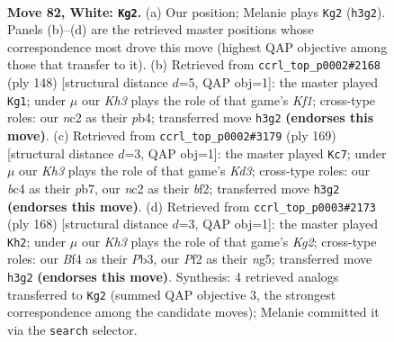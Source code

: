 \documentclass[11pt]{article}
\begin{document}
\clearpage

\begin{figure}[p]\centering
\begin{subfigure}{0.46\textwidth}\centering
\resizebox{\linewidth}{!}{%
\newchessgame
\chessboard[
  setfen={8/7k/8/8/2b2B2/7K/2n2P2/8 w - - 9 82},
  showmover=false,
  pgfstyle=straightmove, color=movearrow, markmove={h3-g2}
]}
\caption{}
\end{subfigure}\hfill
\begin{subfigure}{0.46\textwidth}\centering
\resizebox{\linewidth}{!}{%
\newchessgame
\chessboard[
  setfen={8/3B4/8/8/1p5k/1P6/8/2b2K2 w - - 12 75},
  showmover=false,
  pgfstyle=straightmove, color=movearrow, markmove={f1-g1}
]}
\caption{}
\end{subfigure}
\\[4pt]
\begin{subfigure}{0.46\textwidth}\centering
\resizebox{\linewidth}{!}{%
\newchessgame
\chessboard[
  setfen={8/1P5p/3k3b/8/6K1/8/5B2/8 b - - 0 85},
  showmover=false,
  pgfstyle=straightmove, color=movearrow, markmove={d6-c7}
]}
\caption{}
\end{subfigure}\hfill
\begin{subfigure}{0.46\textwidth}\centering
\resizebox{\linewidth}{!}{%
\newchessgame
\chessboard[
  setfen={4B3/8/8/6n1/1b1k4/1P6/6K1/8 w - - 14 85},
  showmover=false,
  pgfstyle=straightmove, color=movearrow, markmove={g2-h2}
]}
\caption{}
\end{subfigure}
\caption{\textbf{Move 82, White: \texttt{Kg2}.} (a) Our position; Melanie plays \texttt{Kg2} (\texttt{h3g2}). Panels (b)--(d) are the retrieved master positions whose correspondence most drove this move (highest QAP objective among those that transfer to it). (b) Retrieved from \texttt{ccrl\_top\_p0002\#2168} (ply 148) [structural distance $d$=5, QAP obj=1]: the master played \texttt{Kg1}; under $\mu$ our \emph{Kh3} plays the role of that game's \emph{Kf1}; cross-type roles: our \emph{n}c2 as their \emph{p}b4; transferred move \texttt{h3g2} \textbf{(endorses this move)}. (c) Retrieved from \texttt{ccrl\_top\_p0002\#3179} (ply 169) [structural distance $d$=3, QAP obj=1]: the master played \texttt{Kc7}; under $\mu$ our \emph{Kh3} plays the role of that game's \emph{Kd3}; cross-type roles: our \emph{b}c4 as their \emph{p}b7, our \emph{n}c2 as their \emph{b}f2; transferred move \texttt{h3g2} \textbf{(endorses this move)}. (d) Retrieved from \texttt{ccrl\_top\_p0003\#2173} (ply 168) [structural distance $d$=3, QAP obj=1]: the master played \texttt{Kh2}; under $\mu$ our \emph{Kh3} plays the role of that game's \emph{Kg2}; cross-type roles: our \emph{B}f4 as their \emph{P}b3, our \emph{P}f2 as their \emph{n}g5; transferred move \texttt{h3g2} \textbf{(endorses this move)}. Synthesis: 4 retrieved analogs transferred to \texttt{Kg2} (summed QAP objective 3, the strongest correspondence among the candidate moves); Melanie committed it via the \texttt{search} selector.}
\label{fig:thought-m162}
\end{figure}
\end{document}
